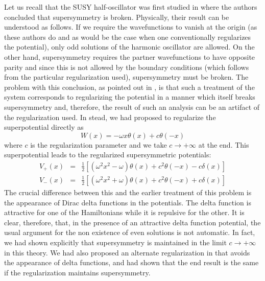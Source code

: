 \documentclass[a4paper,amssymb,aps]{revtex4}
\begin{document}
Let us recall that the SUSY half-oscillator was first studied in
\cite{roy} where the authors concluded that supersymmetry is
broken. Physically, their result can be understood as follows. If we
require the wavefunctions to vanish at the origin (as these authors do
and as would be the
case when one conventionally regularizes the potential), only odd
solutions of the harmonic oscillator are allowed. On the other hand,
supersymmetry requires the partner wavefunctions to have opposite
parity and since this is not allowed by the boundary conditions (which
follows from the particular regularization used),
supersymmetry must be broken. The problem with this conclusion, as
pointed  out in
\cite{das}, is that such a treatment of the system corresponds to
regularizing the potential in a manner which itself breaks
supersymmetry  and,
therefore, the result of such an analysis can be an artifact of the
regularization used. In stead, we had proposed to regularize the
superpotential directly as
\begin{equation}
W (x) = -\omega x \theta (x) + c \theta (-x)
\end{equation}
where $c$ is the regularization parameter and we take $c \rightarrow +
\infty $ at the end.  This superpotential leads to the
regularized supersymmetric potentials:
\begin{eqnarray}
V_+ (x)  & = & \frac{1}{2} [ (\omega^2 x^2 - \omega) \theta (x) + c^2 \theta
(-x) - c \delta (x) ]  \nonumber  \\
V_- (x)  & = & \frac{1}{2} [ (\omega^2 x^2 + \omega) \theta (x) + c^2 \theta
(-x) + c \delta (x) ]
\end{eqnarray}
The crucial difference between this and the earlier
treatment of this problem \cite{roy} is the appearance of Dirac delta
functions  in the potentials.
The delta function is attractive for one of the Hamiltonians while it
is repulsive for the other.
It is clear, therefore, that, in the presence of an attractive delta
function potential, the usual argument for the non existence of even
solutions is not automatic. In fact, we had shown explicitly that
supersymmetry is maintained in the limit $c\rightarrow +\infty$ in
this theory.  We had also proposed an alternate regularization in
\cite{das} 
that avoids the appearance of delta functions, and had shown that  the
end  result is the same if the regularization maintains supersymmetry.
\end{document}
